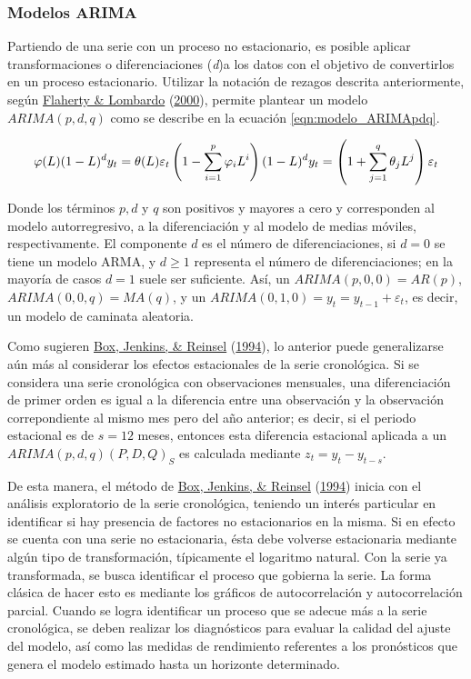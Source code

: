 \documentclass[
]{article}
\begin{document}
\subsubsection{Modelos ARIMA}

Partiendo de una serie con un proceso no estacionario, es posible
aplicar transformaciones o diferenciaciones (\emph{d})a los datos con el
objetivo de convertirlos en un proceso estacionario. Utilizar la
notación de rezagos descrita anteriormente, según
\protect\hyperlink{ref-Lombardo}{Flaherty \& Lombardo}
(\protect\hyperlink{ref-Lombardo}{2000}), permite plantear un modelo
\(ARIMA(p,d,q)\) como se describe en la ecuación
\ref{eqn:modelo_ARIMApdq}.

\begin{equation}
\label{eqn:modelo_ARIMApdq}
\varphi(L)(1-L)^dy_t=\theta(L)\varepsilon_t\\
\left(1-\sum_{i=1}^p \varphi_iL^i \right)(1-L)^d y_t=\left(1+\sum_{j=1}^q \theta_jL^j \right) \varepsilon_t
\end{equation}

Donde los términos \(p, d\) y \(q\) son positivos y mayores a cero y
corresponden al modelo autorregresivo, a la diferenciación y al modelo
de medias móviles, respectivamente. El componente \(d\) es el número de
diferenciaciones, si \(d=0\) se tiene un modelo ARMA, y \(d\geq1\)
representa el número de diferenciaciones; en la mayoría de casos \(d=1\)
suele ser suficiente. Así, un \(ARIMA(p,0,0)=AR(p)\),
\(ARIMA(0,0,q)=MA(q)\), y un \(ARIMA(0,1,0)=y_t=y_{t-1}+\varepsilon_t\),
es decir, un modelo de caminata aleatoria.

Como sugieren \protect\hyperlink{ref-box-jenkins}{Box, Jenkins, \&
Reinsel} (\protect\hyperlink{ref-box-jenkins}{1994}), lo anterior puede
generalizarse aún más al considerar los efectos estacionales de la serie
cronológica. Si se considera una serie cronológica con observaciones
mensuales, una diferenciación de primer orden es igual a la diferencia
entre una observación y la observación correpondiente al mismo mes pero
del año anterior; es decir, si el periodo estacional es de \(s=12\)
meses, entonces esta diferencia estacional aplicada a un
\(ARIMA(p,d,q)(P,D,Q)_S\) es calculada mediante \(z_t=y_t-y_{t-s}\).

De esta manera, el método de \protect\hyperlink{ref-box-jenkins}{Box,
Jenkins, \& Reinsel} (\protect\hyperlink{ref-box-jenkins}{1994}) inicia
con el análisis exploratorio de la serie cronológica, teniendo un
interés particular en identificar si hay presencia de factores no
estacionarios en la misma. Si en efecto se cuenta con una serie no
estacionaria, ésta debe volverse estacionaria mediante algún tipo de
transformación, típicamente el logaritmo natural. Con la serie ya
transformada, se busca identificar el proceso que gobierna la serie. La
forma clásica de hacer esto es mediante los gráficos de autocorrelación
y autocorrelación parcial. Cuando se logra identificar un proceso que se
adecue más a la serie cronológica, se deben realizar los diagnósticos
para evaluar la calidad del ajuste del modelo, así como las medidas de
rendimiento referentes a los pronósticos que genera el modelo estimado
hasta un horizonte determinado.
\end{document}
